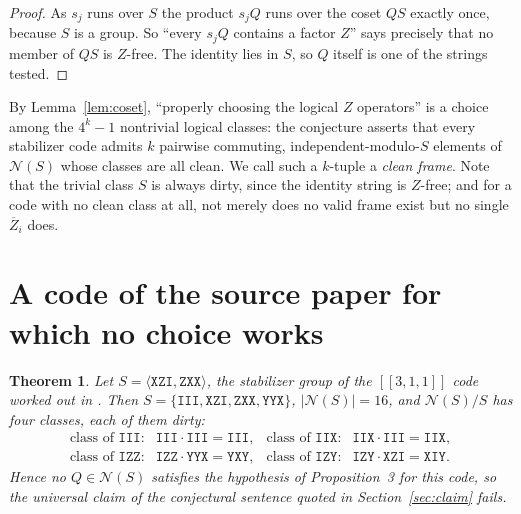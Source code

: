 \documentclass[11pt]{amsart}
\newtheorem{theorem}{Theorem}
\theoremstyle{remark}
\theoremstyle{definition}
\newcommand{\NN}{\mathcal N}
\newcommand{\Zb}{\overline Z}
\newcommand{\str}[1]{\texttt{#1}}
\begin{document}
\begin{proof}
As $s_j$ runs over $S$ the product $s_jQ$ runs over the coset $QS$ exactly once, because $S$ is a
group. So ``every $s_jQ$ contains a factor $Z$'' says precisely that no member of $QS$ is $Z$-free.
The identity lies in $S$, so $Q$ itself is one of the strings tested.
\end{proof}

By Lemma~\ref{lem:coset}, ``properly choosing the logical $Z$ operators'' is a choice among the
$4^k-1$ nontrivial logical classes: the conjecture asserts that every stabilizer code admits $k$
pairwise commuting, independent-modulo-$S$ elements of $\NN(S)$ whose classes are all clean. We
call such a $k$-tuple a \emph{clean frame}. Note that the trivial class $S$ is always dirty, since
the identity string is $Z$-free; and for a code with no clean class at all, not merely does no valid
frame exist but no single $\Zb_i$ does.

\section{A code of the source paper for which no choice works}\label{sec:witness}

\begin{theorem}\label{thm:311}
Let $S=\langle \str{XZI},\str{ZXX}\rangle$, the stabilizer group of the $[[3,1,1]]$ code worked out
in \cite{ZL}. Then
$S=\{\str{III},\str{XZI},\str{ZXX},\str{YYX}\}$, $|\NN(S)|=16$, and $\NN(S)/S$ has four classes,
each of them dirty:
\[
\begin{array}{llll}
 \text{class of }\str{III}: & \str{III}\cdot\str{III}=\str{III}, &
 \text{class of }\str{IIX}: & \str{IIX}\cdot\str{III}=\str{IIX},\\
 \text{class of }\str{IZZ}: & \str{IZZ}\cdot\str{YYX}=\str{YXY}, &
 \text{class of }\str{IZY}: & \str{IZY}\cdot\str{XZI}=\str{XIY}.
\end{array}
\]
Hence no $Q\in\NN(S)$ satisfies the hypothesis of Proposition~3 for this code, so the universal
claim of the conjectural sentence quoted in Section~\ref{sec:claim} fails.
\end{theorem}
\end{document}
